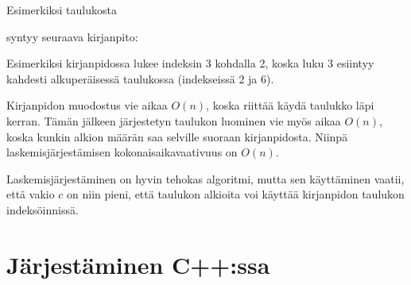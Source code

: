 Esimerkiksi taulukosta
\begin{center}
\end{center}
syntyy seuraava kirjanpito:
\begin{center}
\end{center}

Esimerkiksi kirjanpidossa lukee indeksin 3 kohdalla 2,
koska luku 3 esiintyy kahdesti alkuperäisessä
taulukossa (indekseissä 2 ja 6).

Kirjanpidon muodostus vie aikaa $O(n)$,
koska riittää käydä taulukko läpi kerran.
Tämän jälkeen järjestetyn taulukon luominen
vie myös aikaa $O(n)$, koska kunkin alkion
määrän saa selville suoraan kirjanpidosta.
Niinpä laskemisjärjestämisen
kokonaisaikavaativuus on $O(n)$.

Laskemisjärjestäminen on hyvin tehokas algoritmi,
mutta sen käyttäminen vaatii,
että vakio $c$ on niin pieni,
että taulukon alkioita voi käyttää
kirjanpidon taulukon indeksöinnissä.

\section{Järjestäminen C++:ssa}


